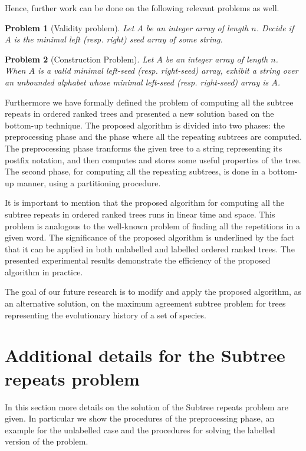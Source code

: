 \documentclass[preprint,12pt]{elsarticle}
\newtheorem{problem}{Problem}
\begin{document}
Hence, further work can be done on the following relevant problems as well.
%
\begin{problem}[Validity problem]
Let $A$ be an integer array of length $n$. Decide if $A$ is the minimal left (resp. right) seed array of some string.
\end{problem}
%
\begin{problem}[Construction Problem]
Let $A$ be an integer array of length $n$. When $A$ is a valid minimal left-seed (resp. right-seed) array, exhibit a string over an unbounded
alphabet whose minimal left-seed (resp. right-seed) array is $A$.
\end{problem}

Furthermore we have formally defined the problem of computing all the subtree 
repeats in ordered ranked trees and presented a new solution based on the bottom-up
technique. The proposed algorithm is divided into two phases: the preprocessing phase
and the phase where all the repeating subtrees are computed. The preprocessing
phase tranforms the given tree to a string representing its postfix notation, and
then computes and stores some useful properties of the tree. The second phase, for 
computing all the repeating subtrees, is done in a bottom-up manner, using a 
partitioning procedure. 

It is important to mention that the proposed algorithm for computing
all the subtree repeats in ordered ranked trees runs in linear time and space.
This problem is analogous to the well-known problem of finding all the repetitions in a given word.
The significance of the proposed algorithm is underlined by the fact that it can be applied in both
unlabelled and labelled ordered ranked trees. The presented experimental results
demonstrate the efficiency of the proposed algorithm in practice.

The goal of our future research is to modify and apply the proposed algorithm, as an alternative solution, 
on the maximum agreement subtree problem for trees representing the evolutionary history of 
a set of species.


\newpage



\newpage
\appendix

\section{Additional details for the Subtree repeats problem}
In this section more details on the solution of the Subtree repeats problem are given. In particular we show the procedures of the preprocessing phase, an example for the unlabelled case and the procedures for solving the labelled version of the problem.
\end{document}
